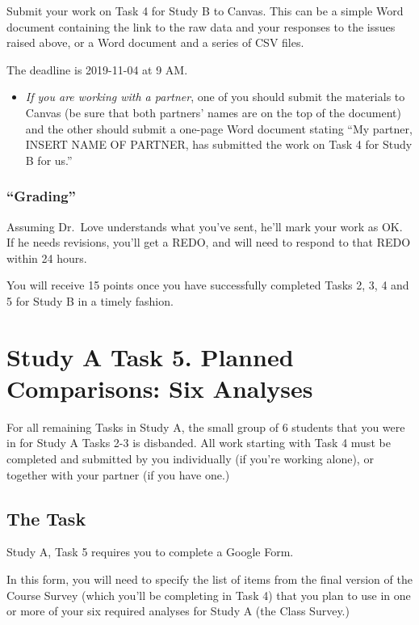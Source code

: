 \documentclass[]{book}
\providecommand{\tightlist}{%
  \setlength{\itemsep}{0pt}\setlength{\parskip}{0pt}}
\begin{document}
Submit your work on Task 4 for Study B to Canvas. This can be a simple Word document containing the link to the raw data and your responses to the issues raised above, or a Word document and a series of CSV files.

The deadline is 2019-11-04 at 9 AM.

\begin{itemize}
\tightlist
\item
  \emph{If you are working with a partner}, one of you should submit the materials to Canvas (be sure that both partners' names are on the top of the document) and the other should submit a one-page Word document stating ``My partner, INSERT NAME OF PARTNER, has submitted the work on Task 4 for Study B for us.''
\end{itemize}

\hypertarget{grading-6}{%
\subsection{``Grading''}\label{grading-6}}

Assuming Dr.~Love understands what you've sent, he'll mark your work as OK. If he needs revisions, you'll get a REDO, and will need to respond to that REDO within 24 hours.

You will receive 15 points once you have successfully completed Tasks 2, 3, 4 and 5 for Study B in a timely fashion.

\hypertarget{task5a}{%
\chapter{Study A Task 5. Planned Comparisons: Six Analyses}\label{task5a}}

For all remaining Tasks in Study A, the small group of 6 students that you were in for Study A Tasks 2-3 is disbanded. All work starting with Task 4 must be completed and submitted by you individually (if you're working alone), or together with your partner (if you have one.)

\hypertarget{the-task-4}{%
\section{The Task}\label{the-task-4}}

Study A, Task 5 requires you to complete a Google Form.

In this form, you will need to specify the list of items from the final version of the Course Survey (which you'll be completing in Task 4) that you plan to use in one or more of your six required analyses for Study A (the Class Survey.)
\end{document}
